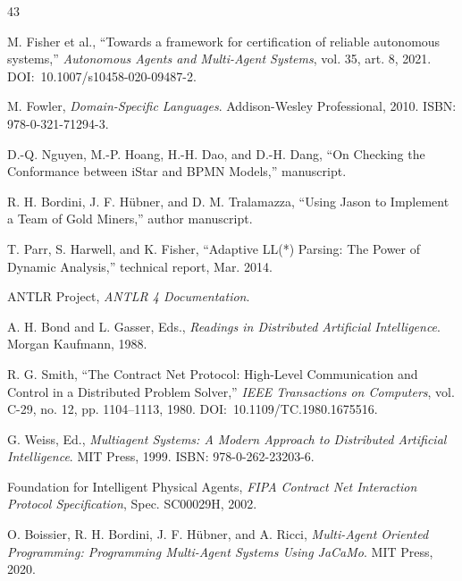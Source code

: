 \documentclass[12pt,a4paper,oneside]{extreport}
\begin{document}
\begin{thebibliography}{43}

M. Fisher et al., ``Towards a framework for certification of reliable autonomous systems,'' \emph{Autonomous Agents and Multi-Agent Systems}, vol. 35, art. 8, 2021. \mbox{DOI: 10.1007/s10458-020-09487-2}.


M. Fowler, \emph{Domain-Specific Languages}. Addison-Wesley Professional, 2010. ISBN: 978-0-321-71294-3.


D.-Q. Nguyen, M.-P. Hoang, H.-H. Dao, and D.-H. Dang, ``On Checking the Conformance between iStar and BPMN Models,'' manuscript.


R. H. Bordini, J. F. Hübner, and D. M. Tralamazza, ``Using Jason to Implement a Team of Gold Miners,'' author manuscript.


T. Parr, S. Harwell, and K. Fisher, ``Adaptive LL(*) Parsing: The Power of Dynamic Analysis,'' technical report, Mar. 2014.


ANTLR Project, \emph{ANTLR 4 Documentation}.


A. H. Bond and L. Gasser, Eds., \emph{Readings in Distributed Artificial Intelligence}. Morgan Kaufmann, 1988.


R. G. Smith, ``The Contract Net Protocol: High-Level Communication and Control in a Distributed Problem Solver,'' \emph{IEEE Transactions on Computers}, vol. C-29, no. 12, pp. 1104--1113, 1980. \mbox{DOI: 10.1109/TC.1980.1675516}.


G. Weiss, Ed., \emph{Multiagent Systems: A Modern Approach to Distributed Artificial Intelligence}. MIT Press, 1999. ISBN: 978-0-262-23203-6.


Foundation for Intelligent Physical Agents, \emph{FIPA Contract Net Interaction Protocol Specification}, Spec. SC00029H, 2002.


O. Boissier, R. H. Bordini, J. F. Hübner, and A. Ricci, \emph{Multi-Agent Oriented Programming: Programming Multi-Agent Systems Using JaCaMo}. MIT Press, 2020.



\end{thebibliography}
\end{document}
